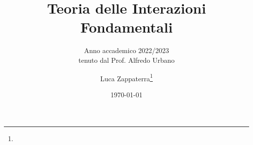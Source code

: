 \documentclass[
	fontsize=10pt, %
	twoside=false, %
	numbers=noenddot, %
]{kaobook}
\begin{document}

\titlehead{The \texttt{kaobook} class}
\subject{Appunti del corso di}

\title[Teoria delle Interazioni Fondamentali]{Teoria delle Interazioni Fondamentali}
\subtitle{Anno accademico 2022/2023\\ tenuto dal Prof. Alfredo Urbano}

\author[Luca Zappaterra]{Luca Zappaterra\thanks{}}

\date{\today}

\publishers{}


\frontmatter %




\makeatletter
\uppertitleback{\@titlehead} %
\end{document}
